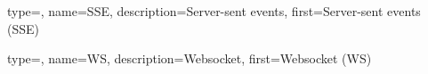 


{
    type=\acronymtype,
    name={SSE},
    description={Server-sent events},
    first={Server-sent events (SSE)}
}

{
    type=\acronymtype,
    name={WS},
    description={Websocket},
    first={Websocket (WS)}
}